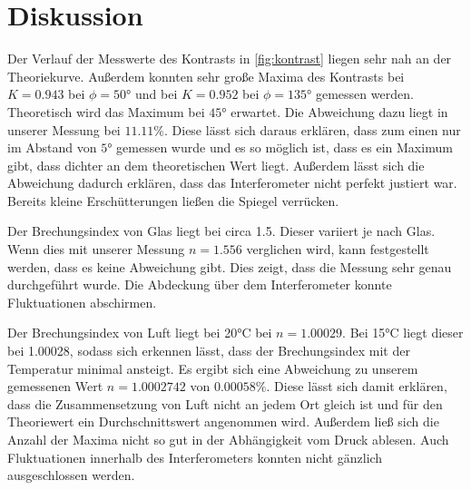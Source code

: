 \section{Diskussion}
\label{sec:Diskussion}

Der Verlauf der Messwerte des Kontrasts in \autoref{fig:kontrast} liegen sehr nah an der Theoriekurve. Außerdem konnten sehr große Maxima 
des Kontrasts bei $K=0.943$ bei $\phi=50°$ und bei $K=0.952$ bei $\phi = 135°$ gemessen werden. Theoretisch wird das Maximum bei $45°$ 
erwartet. Die Abweichung dazu liegt in unserer Messung bei $11.11\%$. Diese lässt sich daraus erklären, dass zum einen nur im Abstand von 
$5°$ gemessen wurde und es so möglich ist, dass es ein Maximum gibt, dass dichter an dem theoretischen Wert liegt. Außerdem lässt sich die 
Abweichung dadurch erklären, dass das Interferometer nicht perfekt justiert war. Bereits kleine Erschütterungen ließen die Spiegel verrücken.

Der Brechungsindex von Glas liegt bei circa 1.5. Dieser variiert je nach Glas.
 Wenn dies mit unserer Messung $n=1.556$ verglichen wird, kann festgestellt werden, dass es keine Abweichung gibt. Dies zeigt, dass die Messung 
sehr genau durchgeführt wurde. Die Abdeckung über dem Interferometer konnte Fluktuationen abschirmen.

Der Brechungsindex von Luft liegt bei 20°C bei $n=1.00029$. Bei 15°C liegt dieser bei 1.00028, sodass sich erkennen lässt, dass der Brechungsindex 
mit der Temperatur minimal ansteigt. Es ergibt sich eine Abweichung zu unserem gemessenen Wert $n=1.0002742$ von $0.00058\%$. Diese lässt sich damit erklären, 
dass die Zusammensetzung von Luft nicht an jedem Ort gleich ist und für den Theoriewert ein Durchschnittswert angenommen wird. Außerdem 
ließ sich die Anzahl der Maxima nicht so gut in der Abhängigkeit vom Druck ablesen. Auch Fluktuationen innerhalb des Interferometers konnten nicht 
gänzlich ausgeschlossen werden.